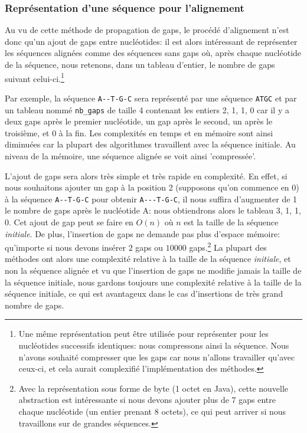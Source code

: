 \subsubsection{Représentation d'une séquence pour l'alignement}
\label{subsubsection:repr_sequence_alignment}

Au vu de cette méthode de propagation de gaps, le procédé d'alignement n'est
donc qu'un ajout de gaps entre nucléotides: il est alors intéressant de
représenter les séquences alignées comme des séquences sans gaps où, après
chaque nucléotide de la séquence, nous retenons, dans un tableau d'entier, le
nombre de gaps suivant celui-ci.\footnote{Une même représentation peut être
	utilisée pour représenter pour les nucléotides successifs identiques: nous
	compressons ainsi la séquence. Nous n'avons souhaité compresser que les gaps
	car nous n'allons travailler qu'avec ceux-ci, et cela aurait complexifié
l'implémentation des méthodes.}

Par exemple, la séquence \verb|A--T-G-C| sera représenté par une séquence
\verb|ATGC| et par un tableau nommé \verb|nb_gaps| de taille 4
contenant les entiers {2, 1, 1, 0} car il y a deux gaps après le premier
nucléotide, un gap après le second, un après le troisième, et 0 à la fin. Les
complexités en temps et en mémoire sont ainsi diminuées car la plupart des
algorithmes travaillent avec la séquence initiale.
Au niveau de la mémoire, une séquence alignée se voit ainsi 'compressée'.

L'ajout de gaps sera alors très simple et très rapide en complexité. En effet,
si nous souhaitons ajouter un gap à la position 2 (supposons qu'on commence en
0) à la séquence \verb|A--T-G-C| pour obtenir \verb|A---T-G-C|, il nous suffira
d'augmenter de 1 le nombre de gaps après le nucléotide A: nous obtiendrons alors
le tableau {3, 1, 1, 0}. Cet ajout de gap peut se faire en $O(n)$ où $n$ est la
taille de la séquence \textit{initiale}. De plus, l'insertion de gaps ne demande
pas plus d'espace mémoire: qu'importe si nous devons insérer $2$ gaps ou $10000$
gaps.\footnote{Avec la représentation sous forme de byte (1 octet en Java),
	cette nouvelle abstraction est intéressante si nous devons ajouter plus de 7
	gaps entre chaque nucléotide (un entier prenant 8 octets), ce qui peut
arriver si nous travaillons sur de grandes séquences.}
La plupart des méthodes ont alors une complexité relative à la taille de la
séquence \textit{initiale}, et non la séquence alignée et vu que l'insertion de
gaps ne modifie jamais la taille de la séquence initiale, nous
gardons toujours une complexité relative à la taille de la séquence initiale, ce
qui est avantageux dans le cas d'insertions de très grand nombre de gaps.

